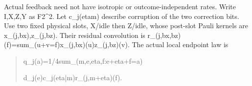 \documentclass[
]{article}
\begin{document}
Actual feedback need not have isotropic or outcome-independent rates.
Write I,X,Z,Y as F2\^{}2. Let c\_j(eta\textbar m) describe corruption of
the two correction bits. Use two fixed physical slots, X/idle then
Z/idle, whose post-slot Pauli kernels are
x\allowbreak{}\_\allowbreak{}(\allowbreak{}j\allowbreak{},\allowbreak{}b\allowbreak{}x\allowbreak{})\allowbreak{},\allowbreak{}z\allowbreak{}\_\allowbreak{}(\allowbreak{}j\allowbreak{},\allowbreak{}b\allowbreak{}z\allowbreak{})\allowbreak{}.
Their residual convolution is
r\allowbreak{}\_\allowbreak{}(\allowbreak{}j\allowbreak{},\allowbreak{}b\allowbreak{}x\allowbreak{},\allowbreak{}b\allowbreak{}z\allowbreak{})\allowbreak{}(\allowbreak{}f\allowbreak{})\allowbreak{}=\allowbreak{}s\allowbreak{}u\allowbreak{}m\allowbreak{}\_\allowbreak{}(\allowbreak{}u\allowbreak{}+\allowbreak{}v\allowbreak{}=\allowbreak{}f\allowbreak{})\allowbreak{}x\allowbreak{}\_\allowbreak{}(\allowbreak{}j\allowbreak{},\allowbreak{}b\allowbreak{}x\allowbreak{})\allowbreak{}(\allowbreak{}u\allowbreak{})\allowbreak{}z\allowbreak{}\_\allowbreak{}(\allowbreak{}j\allowbreak{},\allowbreak{}b\allowbreak{}z\allowbreak{})\allowbreak{}(\allowbreak{}v\allowbreak{})\allowbreak{}.
The actual local endpoint law is

\begin{quote}\small\ttfamily\raggedright\setlength{\parskip}{0pt}
\noindent q\allowbreak{}\_\allowbreak{}j\allowbreak{}(\allowbreak{}a\allowbreak{})\allowbreak{}=\allowbreak{}1\allowbreak{}/\allowbreak{}4\allowbreak{}\hspace*{0.525em}\allowbreak{}s\allowbreak{}u\allowbreak{}m\allowbreak{}\_\allowbreak{}(\allowbreak{}m\allowbreak{},\allowbreak{}e\allowbreak{},\allowbreak{}e\allowbreak{}t\allowbreak{}a\allowbreak{},\allowbreak{}f\allowbreak{}:\allowbreak{}e\allowbreak{}+\allowbreak{}e\allowbreak{}t\allowbreak{}a\allowbreak{}+\allowbreak{}f\allowbreak{}=\allowbreak{}a\allowbreak{})\par
\noindent \hspace*{0.525em}\allowbreak{}\hspace*{0.525em}\allowbreak{}\hspace*{0.525em}\allowbreak{}\hspace*{0.525em}\allowbreak{}\hspace*{0.525em}\allowbreak{}\hspace*{0.525em}\allowbreak{}\hspace*{0.525em}\allowbreak{}\hspace*{0.525em}\allowbreak{}\hspace*{0.525em}\allowbreak{}\hspace*{0.525em}\allowbreak{}\hspace*{0.525em}\allowbreak{}d\allowbreak{}\_\allowbreak{}j\allowbreak{}(\allowbreak{}e\allowbreak{})\allowbreak{}c\allowbreak{}\_\allowbreak{}j\allowbreak{}(\allowbreak{}e\allowbreak{}t\allowbreak{}a\allowbreak{}|\allowbreak{}m\allowbreak{})\allowbreak{}r\allowbreak{}\_\allowbreak{}(\allowbreak{}j\allowbreak{},\allowbreak{}m\allowbreak{}+\allowbreak{}e\allowbreak{}t\allowbreak{}a\allowbreak{})\allowbreak{}(\allowbreak{}f\allowbreak{})\allowbreak{}.\par
\end{quote}
\end{document}
